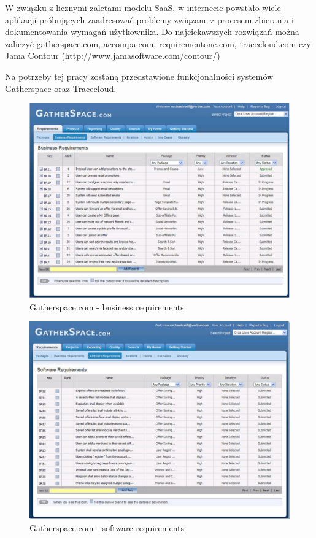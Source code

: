       W związku z licznymi zaletami modelu SaaS, w internecie powstało wiele aplikacji próbujących zaadresować problemy związane z procesem zbierania i dokumentowania wymagań użytkownika. Do najciekawszych rozwiązań można zaliczyć gatherspace.com, accompa.com, requirementone.com, tracecloud.com czy Jama Contour (http://www.jamasoftware.com/contour/)
    
      Na potrzeby tej pracy zostaną przedstawione funkcjonalności systemów Gatherspace oraz Tracecloud.

      \begin{figure}[t]
        \centering
        \includegraphics[width=1.0\textwidth]{img/gatherspace_1.pdf}
        \caption{Gatherspace.com - business requirements}
        \label{fig:gatherspace_1}
      \end{figure}

      \begin{figure}[t]
        \centering
        \includegraphics[width=1.0\textwidth]{img/gatherspace_2.pdf}
        \caption{Gatherspace.com - software requirements}
        \label{fig:gatherspace_2}
      \end{figure}

